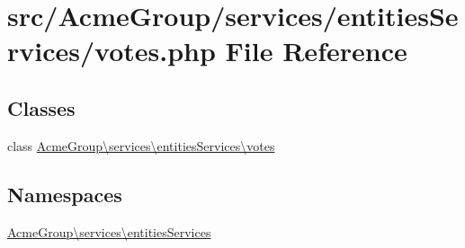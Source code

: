 \hypertarget{votes_8php}{\section{src/\+Acme\+Group/services/entities\+Services/votes.php File Reference}
\label{votes_8php}
}
\subsection*{Classes}
\begin{DoxyCompactItemize}
\item 
class \hyperlink{class_acme_group_1_1services_1_1entities_services_1_1votes}{Acme\+Group\textbackslash{}services\textbackslash{}entities\+Services\textbackslash{}votes}
\end{DoxyCompactItemize}
\subsection*{Namespaces}
\begin{DoxyCompactItemize}
\item 
 \hyperlink{namespace_acme_group_1_1services_1_1entities_services}{Acme\+Group\textbackslash{}services\textbackslash{}entities\+Services}
\end{DoxyCompactItemize}
